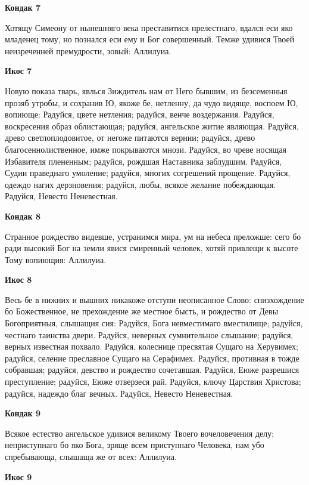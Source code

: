\bfseries Кондак 7\normalfont{}\nopagebreak


Хотящу Симеону от нынешняго века преставитися прелестнаго, вдался еси яко младенец тому, но познался еси ему и Бог совершенный. Темже удивися Твоей неизреченней премудрости, зовый: Аллилуиа.


\bfseries Икос 7\normalfont{}\nopagebreak


Новую показа тварь, явлься Зиждитель нам от Него бывшим, из безсеменныя прозяб утробы, и сохранив Ю, якоже бе, нетленну, да чудо видяще, воспоем Ю, вопиюще: Радуйся, цвете нетления; радуйся, венче воздержания. Радуйся, воскресения образ облистающая; радуйся, ангельское житие являющая. Радуйся, древо светлоплодовитое, от негоже питаются вернии; радуйся, древо благосеннолиственное, имже покрываются мнози. Радуйся, во чреве носящая Избавителя плененным; радуйся, рождшая Наставника заблудшим. Радуйся, Судии праведнаго умоление; радуйся, многих согрешений прощение. Радуйся, одеждо нагих дерзновения; радуйся, любы, всякое желание побеждающая. Радуйся, Невесто Неневестная.


\bfseries Кондак 8\normalfont{}\nopagebreak


Странное рождество видевше, устранимся мира, ум на небеса преложше: сего бо ради высокий Бог на земли явися смиренный человек, хотяй привлещи к высоте Тому вопиющия: Аллилуиа.


\bfseries Икос 8\normalfont{}\nopagebreak


Весь бе в нижних и вышних никакоже отступи неописанное Слово: снизхождение бо Божественное, не прехождение же местное бысть, и рождество от Девы Богоприятныя, слышащия сия: Радуйся, Бога невместимаго вместилище; радуйся, честнаго таинства двери. Радуйся, неверных сумнительное слышание; радуйся, верных известная похвало. Радуйся, колеснице пресвятая Сущаго на Херувимех; радуйся, селение преславное Сущаго на Серафимех. Радуйся, противная в тожде собравшая; радуйся, девство и рождество сочетавшая. Радуйся, Еюже разрешися преступление; радуйся, Еюже отверзеся рай. Радуйся, ключу Царствия Христова; радуйся, надеждо благ вечных. Радуйся, Невесто Неневестная.


\bfseries Кондак 9\normalfont{}\nopagebreak


Всякое естество ангельское удивися великому Твоего вочеловечения делу; неприступнаго бо яко Бога, зряще всем приступнаго Человека, нам убо спребывающа, слышаща же от всех: Аллилуиа.


\bfseries Икос 9\normalfont{}\nopagebreak


